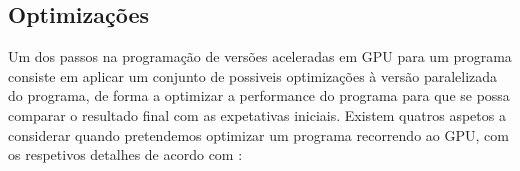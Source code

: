 

\subsection{Optimizações}
\label{optmi}

Um dos passos na programação de versões aceleradas em GPU para um programa consiste em aplicar um conjunto de possiveis optimizações à versão paralelizada do programa, de forma a optimizar a performance do programa para que se possa comparar o resultado final com as expetativas iniciais.
Existem quatros aspetos a considerar quando pretendemos optimizar um programa recorrendo ao GPU, com os respetivos detalhes de acordo com \cite{cudaProgGuide}:
